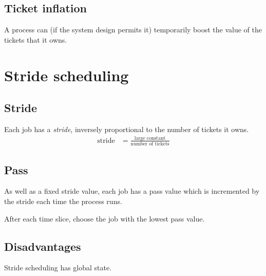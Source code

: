 \subsection{Ticket inflation}

A process can (if the system design permits it) temporarily boost the value of the tickets that it owns.


\section{Stride scheduling}

\subsection{Stride}

Each job has a \textit{stride}, inversely proportional to the number of tickets it owns.
\begin{align}
  \mbox{stride} & = \frac{\mbox{large constant}}{\mbox{number of tickets}} \label{eq:stride}
\end{align}

\subsection{Pass}

As well as a fixed stride value, each job has a pass value which is incremented by the stride each time the process runs.

After each time slice, choose the job with the lowest pass value.

\subsection{Disadvantages}

Stride scheduling has global state.

